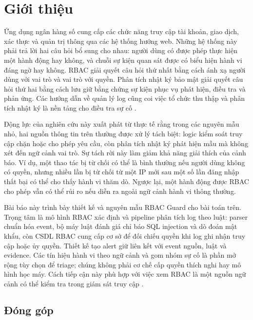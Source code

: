 \section{Giới thiệu}
\label{sec:introduction}

Ứng dụng ngân hàng số cung cấp các chức năng truy cập tài khoản, giao dịch, xác
thực và quản trị thông qua các hệ thống hướng web. Những hệ thống này phải trả
lời hai câu hỏi bổ sung cho nhau: người dùng có được phép thực hiện một hành
động hay không, và chuỗi sự kiện quan sát được có biểu hiện hành vi đáng ngờ hay
không. RBAC giải quyết câu hỏi thứ nhất bằng cách ánh xạ người dùng với vai trò
và vai trò với quyền. Phân tích nhật ký bảo mật giải quyết câu hỏi thứ hai bằng
cách lưu giữ bằng chứng sự kiện phục vụ phát hiện, điều tra và phản ứng. Các
hướng dẫn về quản lý log cũng coi việc tổ chức thu thập và phân tích nhật ký là
nền tảng cho điều tra sự cố \citep{Kent2006SP80092}.

Động lực của nghiên cứu này xuất phát từ thực tế rằng trong các nguyên mẫu nhỏ,
hai nguồn thông tin trên thường được xử lý tách biệt: logic kiểm soát truy cập
chặn hoặc cho phép yêu cầu, còn phân tích nhật ký phát hiện mẫu mà không xét đến
ngữ cảnh vai trò. Sự tách rời này làm giảm khả năng giải thích của cảnh báo. Ví
dụ, một thao tác bị từ chối có thể là bình thường nếu người dùng không có quyền,
nhưng nhiều lần bị từ chối từ một IP mới sau một số lần đăng nhập thất bại có
thể cho thấy hành vi thăm dò. Ngược lại, một hành động được RBAC cho phép vẫn có
thể rủi ro nếu diễn ra ngoài ngữ cảnh hành vi thông thường.

Bài báo này trình bày thiết kế và nguyên mẫu RBAC Guard cho bài toán trên.
Trọng tâm là mô hình RBAC xác định và pipeline phân tích log theo luật: parser
chuẩn hóa event, bộ máy luật đánh giá chỉ báo SQL injection và dò đoán mật khẩu,
còn CSDL RBAC cung cấp cơ sở để đối chiếu quyền khi log ghi nhận truy cập hoặc
ủy quyền. Thiết kế tạo alert giữ liên kết với event nguồn, luật và evidence.
Các tín hiệu hành vi theo ngữ cảnh và gom nhóm sự cố là phần mở rộng tùy chọn để
triage; chúng không phải cơ chế cấp quyền thích nghi hay mô hình học máy. Cách
tiếp cận này phù hợp với việc xem RBAC là một nguồn ngữ cảnh có thể kiểm tra
trong giám sát truy cập \citep{Rose2020SP800207,Xiao2022ContextRisk}.

\subsection{Đóng góp}
\label{subsec:contributions}

